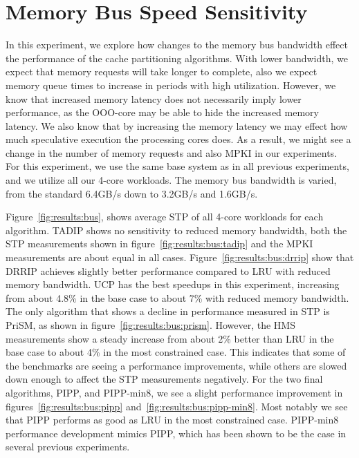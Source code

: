 \section{Memory Bus Speed Sensitivity}
\label{sec:results:bus_sensitivity}

In this experiment, we explore how changes to the memory bus bandwidth effect the performance of the cache partitioning algorithms.
With lower bandwidth, we expect that memory requests will take longer to complete, also we expect memory queue times to increase in periods with high utilization.
However, we know that increased memory latency does not necessarily imply lower performance, as the OOO-core may be able to hide the increased memory latency.
We also know that by increasing the memory latency we may effect how much speculative execution the processing cores does.
As a result, we might see a change in the number of memory requests and also MPKI in our experiments.
For this experiment, we use the same base system as in all previous experiments, and we utilize all our 4-core workloads.
The memory bus bandwidth is varied, from the standard 6.4GB/s down to 3.2GB/s and 1.6GB/s.

Figure~\ref{fig:results:bus}, shows average STP of all 4-core workloads for each algorithm.
TADIP shows no sensitivity to reduced memory bandwidth, both the STP measurements shown in figure~\ref{fig:results:bus:tadip} and the MPKI measurements are about equal in all cases.
Figure~\ref{fig:results:bus:drrip} show that DRRIP achieves slightly better performance compared to LRU with reduced memory bandwidth.
UCP has the best speedups in this experiment, increasing from about 4.8\% in the base case to about 7\% with reduced memory bandwidth.
The only algorithm that shows a decline in performance measured in STP is PriSM, as shown in figure~\ref{fig:results:bus:prism}.
However, the HMS measurements show a steady increase from about 2\% better than LRU in the base case to about 4\% in the most constrained case.
This indicates that some of the benchmarks are seeing a performance improvements, while others are slowed down enough to affect the STP measurements negatively.
For the two final algorithms, PIPP, and PIPP-min8, we see a slight performance improvement in figures~\ref{fig:results:bus:pipp} and~\ref{fig:results:bus:pipp-min8}. 
Most notably we see that PIPP performs as good as LRU in the most constrained case.
PIPP-min8 performance development mimics PIPP, which has been shown to be the case in several previous experiments.


